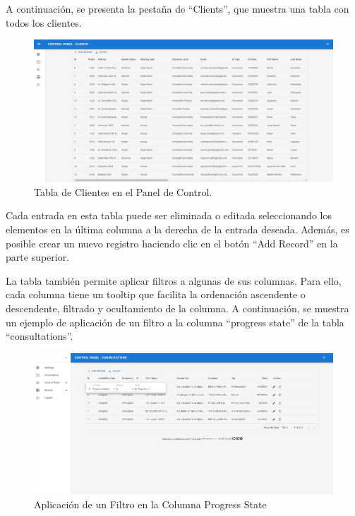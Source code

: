 A continuación, se presenta la pestaña de ``Clients'', que muestra una tabla con todos los clientes.

\begin{figure}[H]
    \centering
    \includegraphics[width=1\linewidth]{fig/clients-real-page.png}
    \caption{Tabla de Clientes en el Panel de Control.}
    \label{fig:clients-table}
\end{figure}

Cada entrada en esta tabla puede ser eliminada o editada seleccionando los elementos en la última columna a la derecha de la entrada deseada. Además, es posible crear un nuevo registro haciendo clic en el botón ``Add Record'' en la parte superior.

La tabla también permite aplicar filtros a algunas de sus columnas. Para ello, cada columna tiene un tooltip que facilita la ordenación ascendente o descendente, filtrado y ocultamiento de la columna. A continuación, se muestra un ejemplo de aplicación de un filtro a la columna ``progress state'' de la tabla ``consultations''.

\begin{figure}[H]
    \centering
    \includegraphics[width=1\linewidth]{fig/tabla-filter.png}
    \caption{Aplicación de un Filtro en la Columna Progress State}
    \label{fig:tabla-filtro-ejemplo}
\end{figure}



